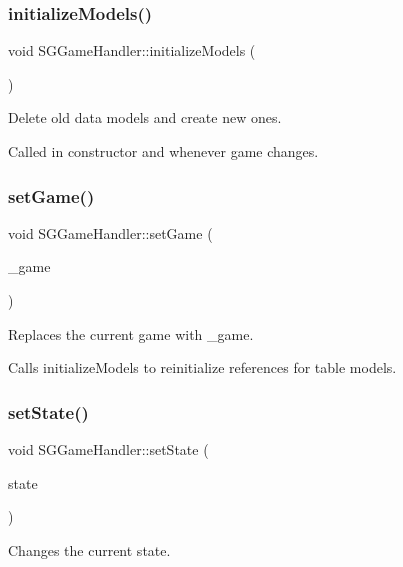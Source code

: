 \subsubsection{\texorpdfstring{initialize\+Models()}{initializeModels()}}
{\footnotesize\ttfamily void S\+G\+Game\+Handler\+::initialize\+Models (\begin{DoxyParamCaption}{ }\end{DoxyParamCaption})\hspace{0.3cm}{\ttfamily [private]}}



Delete old data models and create new ones. 

Called in constructor and whenever game changes. \mbox{\label{classSGGameHandler_a8ba6ee3d6e6648e1db7fe15d287b0277}} 
\subsubsection{\texorpdfstring{set\+Game()}{setGame()}}
{\footnotesize\ttfamily void S\+G\+Game\+Handler\+::set\+Game (\begin{DoxyParamCaption}\item[{const \hyperlink{classSGGame}{S\+G\+Game} \&}]{\+\_\+game }\end{DoxyParamCaption})}



Replaces the current game with \+\_\+game. 

Calls initialize\+Models to reinitialize references for table models. \mbox{\label{classSGGameHandler_a70b3147a78c94d3b7884b096a3a3a352}} 
\subsubsection{\texorpdfstring{set\+State()}{setState()}}
{\footnotesize\ttfamily void S\+G\+Game\+Handler\+::set\+State (\begin{DoxyParamCaption}\item[{int}]{state }\end{DoxyParamCaption})}



Changes the current state. 

